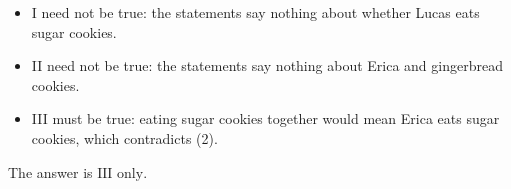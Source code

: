 \begin{itemize}
\item I need not be true: the statements say nothing about whether Lucas eats sugar cookies.
\item II need not be true: the statements say nothing about Erica and gingerbread cookies.
\item III must be true: eating sugar cookies together would mean Erica eats sugar cookies, which contradicts (2).
\end{itemize}
The answer is $\boxed{\text{III only}}$.
